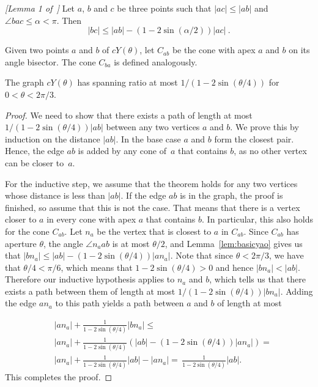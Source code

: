 \documentclass{cccg14}
\newcommand{\cyao}{\ensuremath{cY(\theta)}\xspace}
\begin{document}
\vspace{-0.2em}
\begin{lemma}
 \label{lem:basicyao}\emph{[Lemma 1 of~\cite{barba2014new}]}
Let $a$, $b$ and $c$ be three points such that $|ac| \leq |ab|$ and $\angle bac \leq \alpha < \pi$. Then\vspace{-.1in}
$$ |bc| \leq |ab| - \left( 1 - 2 \sin (\alpha/2) \right)  |ac|~. $$
\end{lemma}
Given two points $a$ and $b$ of \cyao,
let $C_{ab}$ be the cone with apex $a$ and $b$ on its angle bisector.
The cone $C_{ba}$ is defined analogously.

\begin{theorem}
 \label{thm:contyaosmall}
 The graph \cyao has spanning ratio at most $1 / (1 - 2 \sin (\theta/4))$ for $0 < \theta < 2\pi/3$.
\end{theorem}
\begin{proof}
 We need to show that there exists a path of length at most $1 / (1 - 2 \sin (\theta/4))  |ab|$ between any two vertices $a$ and $b$. We prove this by induction on the distance $|ab|$. In the base case $a$ and $b$ form the closest pair. Hence, the edge $ab$ is added by any cone of~$a$ that contains $b$, as no other vertex can be closer to~$a$.
 
 For the inductive step, we assume that the theorem holds for any two vertices whose distance is less than $|ab|$. If the edge $ab$ is in the graph, the proof is finished, so assume that this is not the case. That means that there is a vertex closer to $a$ in every cone with apex $a$ that contains $b$. In particular, this also holds for the cone $C_{ab}$. Let $n_a$ be the vertex that is closest to $a$ in $C_{ab}$. Since $C_{ab}$  has aperture $\theta$, the angle $\angle n_aab$ is at most $\theta / 2$, and Lemma~\ref{lem:basicyao} gives us that 
 $|bn_a| \leq |ab| - (1 - 2 \sin (\theta/4))  |an_a|$. Note that since $\theta < 2\pi/3$, we have that $\theta/4 < \pi/6$, which means that $1 - 2 \sin (\theta/4) > 0$ and hence $|bn_a| < |ab|$. Therefore our inductive hypothesis applies to $n_a$ and $b$, which tells us that there exists a path between them of length at most $1 / (1 - 2 \sin (\theta/4)) |bn_a|$. Adding the edge $an_a$ to this path yields a path between $a$ and $b$ of length at most

\vspace{-1em}
\begin{align*}
& \, |an_a| + \frac{1}{1 - 2 \sin (\theta/4)} |bn_a| \leq\\
& \, |an_a| + \frac{1}{1 - 2 \sin (\theta/4)}\left( |ab| - (1 - 2 \sin (\theta/4))  |an_a| \right)=\\
& \, |an_a| + \frac{1}{1 - 2 \sin (\theta/4)} |ab| - |an_a|
= \, \frac{1}{1 - 2 \sin (\theta/4)} |ab|.
\end{align*}
This completes the proof.
\end{proof}
\end{document}
